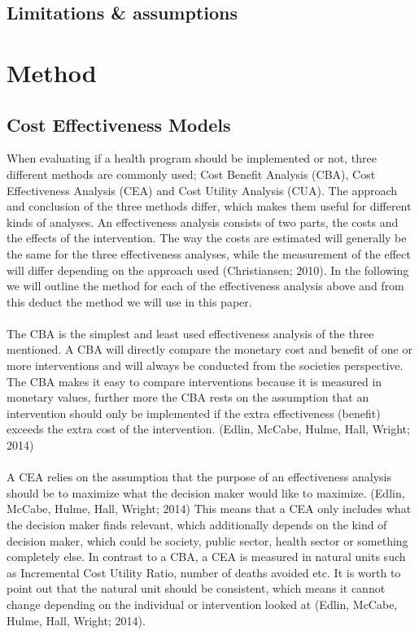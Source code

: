 \documentclass[a4paper,12pt]{article}
\begin{document}
\subsection{Limitations \& assumptions}

\section{Method}

\subsection{Cost Effectiveness Models }

When evaluating if a health program should be implemented or not, three different methods are commonly used; Cost Benefit Analysis (CBA), Cost Effectiveness Analysis (CEA) and Cost Utility Analysis (CUA). The approach and conclusion of the three methods differ, which makes them useful for different kinds of analyses. An effectiveness analysis consists of two parts, the costs and the effects of the intervention. The way the costs are estimated will generally be the same for the three effectiveness analyses, while the measurement of the effect will differ depending on the approach used (Christiansen; 2010). In the following we will outline the method for each of the effectiveness analysis above and from this deduct the method we will use in this paper.  
\\\\
The CBA is the simplest and least used effectiveness analysis of the three mentioned. A CBA will directly compare the monetary cost and benefit of one or more interventions and will always be conducted from the societies perspective. The CBA makes it easy to compare interventions because it is measured in monetary values, further more the CBA rests on the assumption that an intervention should only be implemented if the extra effectiveness (benefit) exceeds the extra cost of the intervention. (Edlin, McCabe, Hulme, Hall, Wright; 2014)
\\\\
A CEA relies on the assumption that the purpose of an effectiveness analysis should be to maximize what the decision maker would like to maximize. (Edlin, McCabe, Hulme, Hall, Wright; 2014) This means that a CEA only includes what the decision maker finds relevant, which additionally depends on the kind of decision maker, which could be society, public sector, health sector or something completely else. In contrast to a CBA, a CEA is measured in natural units such as Incremental Cost Utility Ratio, number of deaths avoided etc. It is worth to point out that the natural unit should be consistent, which means it cannot change depending on the individual or intervention looked at (Edlin, McCabe, Hulme, Hall, Wright; 2014). 
\end{document}
